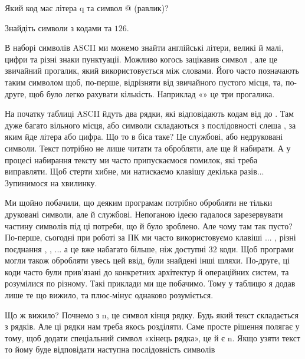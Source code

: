 \begin{exercise}
Який код має літера \chr q та символ \chr @ (равлик)?
\end{exercise}

\begin{exercise}
Знайдіть символи з кодами  та $126$.
\end{exercise}

В наборі символів ASCII ми можемо знайти англійські літери, великі й малі, цифри та різні знаки пунктуації.
Можливо когось зацікавив символ \chspace, але це звичайний прогалик, який використовується між словами.
Його часто позначають таким символом щоб, по-перше, відрізняти від звичайного пустого місця, та, по-друге, щоб було легко рахувати кількість.
Наприклад «\texttt{\s\s\s}» це три прогалика.

На початку таблиці ASCII йдуть два рядки, які відповідають кодам від  до .
Там дуже багато вільного місця, або символи складаються з послідовності слеша \chesc{}, за яким йде літера або цифра.
Що то в біса таке?
Це службові, або недруковані символи.
Текст потрібно не лише читати та обробляти, але ще й набирати.
А у процесі набирання тексту ми часто припускаємося помилок, які треба виправляти.
Щоб стерти хибне,  ми натискаємо клавішу \keys{\backspace} декілька разів...
Зупинимося на хвилинку.

Ми щойно побачили, що деяким програмам потрібно обробляти не тільки друковані символи, але й службові.
Непоганою ідеєю гадалося зарезервувати частину символів під ці потреби, що й було зроблено.
Але чому там так пусто?
По-перше, сьогодні при роботі за ПК ми часто використовуємо клавіші  ... , різні поєднання , , ... а це вже набагато більше, ніж доступні $32$ коди.
Щоб програми могли також обробляти увесь цей ввід, були знайдені інші шляхи.
По-друге, ці коди часто були прив'язані до конкретних архітектур й операційних систем, та розумілися по різному.
Такі приклади ми ще побачимо.
Тому у таблицю я додав лише те що вижило, та плюс-мінус однаково розуміється.

Що ж вижило?
Почнемо з \chesc n, це символ кінця рядку.
Будь який текст складається з рядків.
Але ці рядки нам треба якось розділяти.
Саме просте рішення полягає у тому, щоб додати спеціальний символ «кінець рядка», це й є \chesc n.
Якщо узяти текст
\noindent то йому буде відповідати наступна послідовність символів

